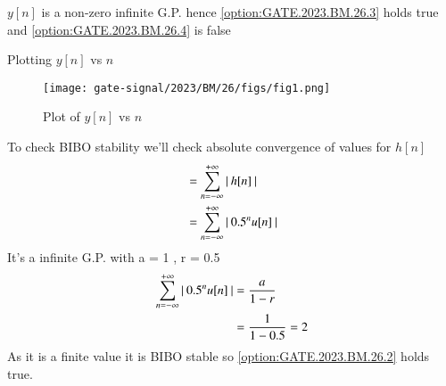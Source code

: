 \documentclass[journal,12pt,twocolumn]{IEEEtran}
\begin{document}
$y[n]$ is a non-zero infinite G.P. hence \ref{option:GATE.2023.BM.26.3} holds true and \ref{option:GATE.2023.BM.26.4} is false

\pagebreak
Plotting $y[n]$ vs $n$
\begin{figure}[h]
    \texttt{[image: gate-signal/2023/BM/26/figs/fig1.png]}
    \caption{Plot of $y[n]$ vs $n$}
    \label{fig:GATE.2023.BM.26.1}
\end{figure}


To check BIBO stability we'll check absolute convergence of values for $h[n]$
\begin{align}
&= \sum^{+\infty}_{n = -\infty}\left\vert\:h[n]\:\right\vert \\
&= \sum^{+\infty}_{n = -\infty}\left\vert\:0.5^nu[n]\:\right\vert
\end{align}
It's a infinite G.P. with a = 1 , r = 0.5
\begin{align}
\sum^{+\infty}_{n = -\infty}\left\vert\:0.5^nu[n]\:\right\vert &= \frac{a}{1 -r} \\
&= \frac{1}{1 - 0.5} = 2
\end{align}
As it is a finite value it is BIBO stable so \ref{option:GATE.2023.BM.26.2} holds true.
\end{document}
